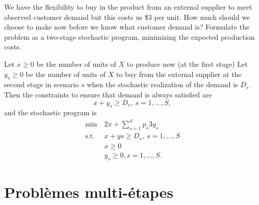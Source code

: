 \documentclass[12pt]{book}
\begin{document}
\begin{enumerate}
\begin{enumerate}[(a)]
We have the flexibility to buy in the product from an external supplier to meet
observed customer demand but this costs us \$3 per unit.
How much should we choose to make now before we know what customer
demand is?
Formulate the problem as a two-stage stochastic program, minimizing the expected production costs.

Let $x \geq 0$ be the number of units of $X$ to produce now (at the first stage)
Let $y_s \geq 0$ be the number of units of $X$ to buy from the external supplier at the
second stage in scenario $s$ when the stochastic realization of the demand is $D_s$.
Then the constraints to ensure that demand is always satisfied are
$$
x + y_s \geq D_s,\ s = 1,\ldots,S,
$$
and the stochastic program is
\begin{align*}
\min\ & 2x + \sum_{s = 1}^S p_s 3 y_s \\
\mbox{s.t. } &  x + ys \geq D_s,\ s = 1,\ldots,S \\
& x \geq 0 \\
& y_s \geq 0, s = 1,\ldots,S.
\end{align*}

\end{enumerate}

\end{enumerate}

\chapter{Problèmes multi-étapes}
\end{document}
